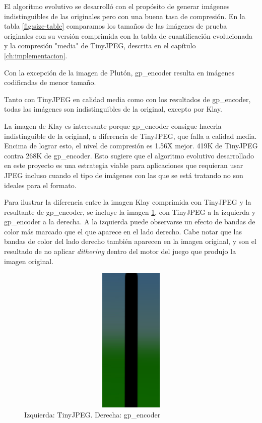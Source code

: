 El algoritmo evolutivo se desarrolló con el propósito de generar imágenes
indistinguibles de las originales pero con una buena tasa de compresión. En la
tabla \ref{fig:size-table} comparamos los tamaños de las imágenes de prueba
originales con su versión comprimida con la tabla de cuantificación
evolucionada y la compresión "media" de TinyJPEG, descrita en el capítulo
\ref{ch:implementacion}.

Con la excepción de la imagen de Plutón, gp\_encoder resulta en imágenes codificadas de menor tamaño.

Tanto con TinyJPEG en calidad media como con los resultados de gp\_encoder, todas las imágenes son indistinguibles de la original, excepto por Klay.

La imagen de Klay es interesante porque gp\_encoder consigue hacerla
indistinguible de la original, a diferencia de TinyJPEG, que falla a calidad
media. Encima de lograr esto, el nivel de compresión es 1.56X mejor. 419K de
TinyJPEG contra 268K de gp\_encoder. Esto sugiere que el algoritmo evolutivo
desarrollado en este proyecto es una estrategia viable para aplicaciones que
requieran usar JPEG incluso cuando el tipo de imágenes con las que se está
tratando no son ideales para el formato.

Para ilustrar la diferencia entre la imagen Klay comprimida con TinyJPEG y la
resultante de gp\_encoder, se incluye la imagen \ref{img:banding}, con TinyJPEG
a la izquierda y gp\_encoder a la derecha. A la izquierda puede observarse un
efecto de bandas de color más marcado que el que aparece en el lado derecho.
Cabe notar que las bandas de color del lado derecho también aparecen en la
imagen original, y son el resultado de no aplicar \emph{dithering} dentro del
motor del juego que produjo la imagen original.

\begin{figure}
    \includegraphics[width=400pt, height=200pt]{banding}
    \caption{Izquierda: TinyJPEG. Derecha: gp\_encoder}
    \label{img:banding}
\end{figure}

